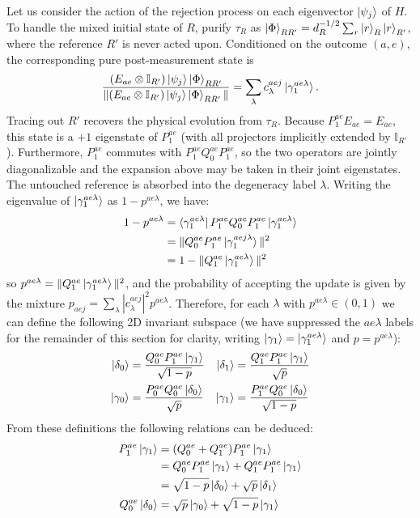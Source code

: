 \documentclass[aps,floatfix,10pt,amssymb,amsfont,amsmath,superscriptaddress,float,nofootinbib,longbibliography,nobalancelastpage,twocolumn]{revtex4-2}
\begin{document}
Let us consider the action of the rejection process on each eigenvector $\ket{\psi_j}$ of $H$. To handle the mixed initial state of $R$, purify $\tau_R$ as $\ket{\Phi}_{RR'}=d_R^{-1/2}\sum_r\ket{r}_R\ket{r}_{R'}$, where the reference $R'$ is never acted upon. Conditioned on the outcome $(a,e)$, the corresponding pure post-measurement state is
\begin{equation}
    \frac{(E_{ae}\otimes\mathbb I_{R'})\ket{\psi_j}\ket{\Phi}_{RR'}}
    {\|(E_{ae}\otimes\mathbb I_{R'})\ket{\psi_j}\ket{\Phi}_{RR'}\|}
    = \sum_{\lambda} c_{\lambda}^{aej}\ket{\gamma_1^{ae \lambda}}.
\end{equation}
Tracing out $R'$ recovers the physical evolution from $\tau_R$. Because $P_1^{ae}E_{ae}=E_{ae}$, this state is a $+1$ eigenstate of $P_1^{ae}$ (with all projectors implicitly extended by $\mathbb I_{R'}$). Furthermore, $P_1^{ae}$ commutes with $P^{ae}_1Q^{ae}_0P^{ae}_1$, so the two operators are jointly diagonalizable and the expansion above may be taken in their joint eigenstates. The untouched reference is absorbed into the degeneracy label $\lambda$.
Writing the eigenvalue of $\ket{\gamma^{ae\lambda}_1}$ as $1-p^{ae\lambda}$, we have: \begin{align}1-p^{ae\lambda}&=\bra{\gamma^{ae\lambda}_1}P^{ae}_1Q^{ae}_0P^{ae}_1\ket{\gamma^{ae\lambda}_1} \\&=\|Q^{ae}_0P^{ae}_1\ket{\gamma^{aej\lambda}_1}\|^2\\ &= 1-\|Q^{ae}_1\ket{\gamma^{ae\lambda}_1}\|^2
\end{align}
so $p^{ae\lambda} = \|Q^{ae}_1\ket{\gamma^{ae\lambda}_1}\|^2$, and the probability of accepting the update is given by the mixture $p_{aej} = \sum_{\lambda}|c^{aej}_{\lambda}|^2p^{ae\lambda}$. Therefore, for each $\lambda$ with $p^{ae\lambda} \in (0,1)$ we can define the following 2D invariant subspace (we have suppressed the $ae\lambda$ labels for the remainder of this section for clarity, writing $\ket{\gamma_1} = \ket{\gamma^{ae\lambda}_1}$ and $p = p^{ae\lambda}$):
\begin{align}
    \ket{\delta_0} &= \frac{Q^{ae}_0P^{ae}_1\ket{\gamma_1}}{\sqrt{1-p}} &\ket{\delta_1} &= \frac{Q^{ae}_1P^{ae}_1\ket{\gamma_1}}{\sqrt{p}} \\
    \ket{\gamma_0} &= \frac{P^{ae}_0Q^{ae}_0\ket{\delta_0}}{\sqrt{p}} &\ket{\gamma_1} &= \frac{P^{ae}_1Q^{ae}_0\ket{\delta_0}}{\sqrt{1-p}}
\end{align}
From these definitions the following relations can be deduced:
\begin{align}
\begin{split}
\label{eq:deltagamma0}
    P^{ae}_1 \ket{\gamma_1} &= (Q^{ae}_0+Q^{ae}_1)P^{ae}_1 \ket{\gamma_1}\\
    &= Q^{ae}_0P^{ae}_1 \ket{\gamma_1}+Q^{ae}_1P^{ae}_1 \ket{\gamma_1}\\
    &= \sqrt{1-p} \ket{\delta_0} + \sqrt{p}\ket{\delta_1}\\
    Q^{ae}_0\ket{\delta_0} &= \sqrt{p} \ket{\gamma_0} + \sqrt{1-p} \ket{\gamma_1}
\end{split}
\end{align}
\end{document}
